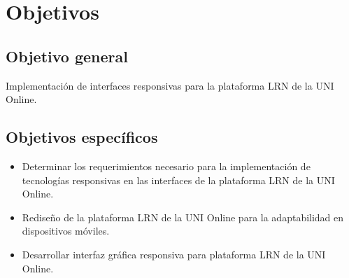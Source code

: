 
\chapter{Objetivos}

\section{Objetivo general}
Implementaci\'on de interfaces responsivas para la plataforma LRN de la UNI Online.

\section{Objetivos espec\'ificos}
	\begin{itemize}
		\item Determinar los requerimientos necesario para la implementaci\'on de tecnolog\'ias responsivas en las interfaces de la plataforma LRN de la UNI Online.
		\item Redise\~no de la plataforma LRN de la UNI Online para la adaptabilidad en dispositivos m\'oviles.
		\item Desarrollar interfaz gr\'afica responsiva para plataforma LRN de la UNI Online.
	\end{itemize}
